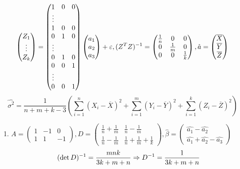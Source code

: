 {{\[\begin{pmatrix}
  Z_1 \\
  \vdots \\
  Z_k
  \end{pmatrix} = 
  \begin{pmatrix}
  1 & 0 & 0 \\
  \vdots \\
  1 & 0 & 0\\
  0 & 1 & 0 \\
  \vdots \\
  0 & 1 & 0 \\
  0 & 0 & 1 \\
  \vdots \\
  0 & 0 & 1
  \end{pmatrix}
  \begin{pmatrix}
  a_1 \\ a_2 \\ a_3 
  \end{pmatrix} + \varepsilon, (Z^TZ)^{-1} = 
  \begin{pmatrix}
  \frac{1}{n} & 0 & 0 \\
  0 & \frac{1}{m} & 0 \\
  0 & 0 & \frac{1}{k}
  \end{pmatrix},
  \hat{a} = \begin{pmatrix} \overline{X} \\ \overline{Y} \\ \overline{Z} \end{pmatrix}
  \]
  \[\hat{\sigma^2} = \frac{1}{n + m + k - 3}\left(\sum_{i = 1}^n (X_i - \overline{X})^2 + \sum_{i = 1}^m (Y_i - \overline{Y})^2 + \sum_{i = 1}^k (Z_i - \overline{Z})^2\right)\]
  \begin{enumerate}[label=\alph*]
    \item $A = 
    \begin{pmatrix}
    1 & -1 & 0\\
    1 & 1 & -1
    \end{pmatrix},
    D =
    \begin{pmatrix}
    \frac{1}{n} + \frac{1}{m} & \frac{1}{n} - \frac{1}{m} \\
    \frac{1}{n} - \frac{1}{m} & \frac{1}{n} + \frac{1}{m} + \frac{1}{k}
    \end{pmatrix}, \hat{\beta} =
    \begin{pmatrix}
    \hat{a_1} - \hat{a_2} \\
    \hat{a_1} + \hat{a_2} - \hat{a_3}
    \end{pmatrix}
    $
    \[
    (\det D)^{-1} = \frac{mnk}{3k + m + n} \Rightarrow D^{-1} = \frac{1}{3k + m + n}
\]
\end{enumerate}}}
